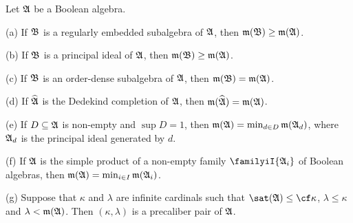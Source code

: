  Let $\frak A$ be a Boolean algebra.

(a) If $\frak B$ is a regularly embedded subalgebra of $\frak A$, then
$\frak m(\frak B)\ge\frak m(\frak A)$.

(b) If $\frak B$ is a principal ideal of $\frak A$, then
$\frak m(\frak B)\ge\frak m(\frak A)$.

(c) If $\frak B$ is an order-dense subalgebra of $\frak A$, then
$\frak m(\frak B)=\frak m(\frak A)$.

(d) If $\widehat{\frak A}$ is the Dedekind completion of $\frak A$, then
$\frak m(\widehat{\frak A})=\frak m(\frak A)$.

(e) If $D\subseteq\frak A$ is non-empty and $\sup D=1$, then
$\frak m(\frak A)=\min_{d\in D}\frak m(\frak A_d)$, where $\frak A_d$ is
the principal ideal generated by $d$.

(f) If $\frak A$ is the simple product of a non-empty family
$\familyiI{\frak A_i}$ of Boolean algebras, then
$\frak m(\frak A)=\min_{i\in I}\frak m(\frak A_i)$.

(g) Suppose that $\kappa$ and $\lambda$ are infinite cardinals such that
$\sat(\frak A)\le\cf\kappa$, $\lambda\le\kappa$ and
$\lambda<\frak m(\frak A)$.   Then $(\kappa,\lambda)$ is a
precaliber pair of $\frak A$.

